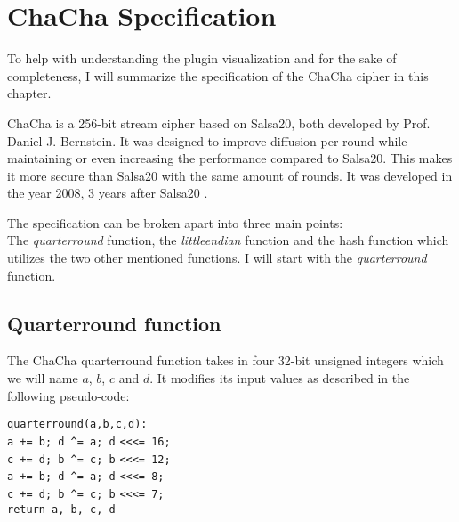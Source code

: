\chapter{ChaCha Specification}
\label{chap:chacha}

To help with understanding the plugin visualization and for the sake of completeness, I will summarize the specification of the ChaCha cipher in this chapter.

ChaCha is a 256-bit stream cipher based on Salsa20, both developed by Prof. Daniel J. Bernstein. It was designed to improve diffusion per round while maintaining or even increasing the performance compared to Salsa20. This makes it more secure than Salsa20 with the same amount of rounds. It was developed in the year 2008, 3 years after Salsa20 \cite{chachaspec}.

The specification can be broken apart into three main points: \\
The \textit{quarterround} function, the \textit{littleendian} function and the hash function which utilizes the two other mentioned functions. I will start with the \textit{quarterround} function.

\section{Quarterround function}
\label{sec:chacha.qr}

The ChaCha quarterround function takes in four 32-bit unsigned integers which we will name $a$, $b$, $c$ and $d$. It modifies its input values as described in the following pseudo-code: 

\begin{center}
\begin{minipage}{0.5\linewidth}
\texttt{quarterround(a,b,c,d):} \\
\hspace*{1em}\texttt{a += b; d  \^{}= a; d} \verb|<<<|\texttt{= 16;} \\
\hspace*{1em}\texttt{c += d; b \^{}= c; b} \verb|<<<|\texttt{= 12;} \\
\hspace*{1em}\texttt{a += b; d \^{}= a; d} \verb|<<<|\texttt{= 8;} \\
\hspace*{1em}\texttt{c += d; b \^{}= c; b} \verb|<<<|\texttt{= 7;} \\
\hspace*{1em}\texttt{return a, b, c, d}
\end{minipage}
\end{center}